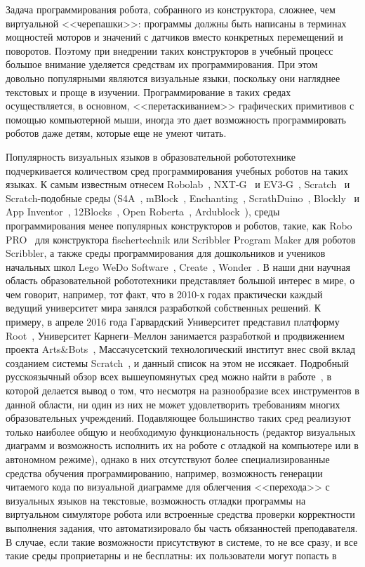 \documentclass[a5paper]{article}
\begin{document}
Задача программирования робота, собранного из конструктора, сложнее, чем виртуальной <<черепашки>>: программы должны быть написаны в терминах мощностей моторов и значений с датчиков вместо конкретных перемещений и поворотов. Поэтому при внедрении таких конструкторов в учебный процесс большое внимание уделяется средствам их программирования. При этом довольно популярными являются визуальные языки, поскольку они нагляднее текстовых и проще в изучении. Программирование в таких средах осуществляется, в основном, <<перетаскиванием>> графических примитивов с помощью компьютерной мыши, иногда это дает возможность программировать роботов даже детям, которые еще не умеют читать. 

Популярность визуальных языков в образовательной робототехнике подчеркивается количеством сред программирования учебных роботов на таких языках. К самым известным отнесем Robolab~\cite{erwin2000lego}, NXT-G~\cite{kelly2010lego} и EV3-G~\cite{valk2014lego}, Scratch~\cite{resnick2009scratch} и Scratch-подобные среды (S4A~\cite{s4a}, mBlock~\cite{mblock}, Enchanting~\cite{enchanting}, ScrathDuino~\cite{scratchduino}, Blockly~\cite{blockly} и App Inventor~\cite{wolber2011app}, 12Blocks~\cite{12blocks}, Open Roberta~\cite{jost2014graphical}, Ardublock~\cite{ardublock}), среды программирования менее популярных конструкторов и роботов, такие, как Robo PRO~\cite{chang2006incorporating} для конструктора fischertechnik или Scribbler Program Maker для роботов Scribbler, а также среды программирования для дошкольников и учеников начальных школ Lego WeDo Software~\cite{mayerova2012pilot}, Create~\cite{cross2013visual}, Wonder~\cite{wonder}. В наши дни научная область образовательной робототехники представляет большой интерес в мире, о чем говорит, например, тот факт, что в 2010-х годах практически каждый ведущий университет мира занялся разработкой собственных решений. К примеру, в апреле 2016 года Гарвардский Университет представил платформу Root~\cite{root}, Университет Карнеги--Меллон занимается разработкой и продвижением проекта Arts\&Bots~\cite{cross2013visual}, Массачусетский технологический институт внес свой вклад созданием системы Scratch~\cite{resnick2009scratch}, и данный список на этом не иссякает. Подробный русскоязычный обзор всех вышеупомянутых сред можно найти в работе~\cite{mordvinov2016NONPUBLISHED}, в которой делается вывод о том, что несмотря на разнообразие всех инструментов в данной области, ни один из них не может удовлетворить требованиям многих образовательных учреждений. Подавляющее большинство таких сред реализуют только наиболее общую и необходимую функциональность (редактор визуальных диаграмм и возможность исполнить их на роботе с отладкой на компьютере или в автономном режиме), однако в них отсутствуют более специализированные средства обучения программированию, например, возможность генерации читаемого кода по визуальной диаграмме для облегчения <<перехода>> с визуальных языков на текстовые, возможность отладки программы на виртуальном симуляторе робота или встроенные средства проверки корректности выполнения задания, что автоматизировало бы часть обязанностей преподавателя. В случае, если такие возможности присутствуют в системе, то не все сразу, и все такие среды проприетарны и не бесплатны: их пользователи могут попасть в 
\end{document}
